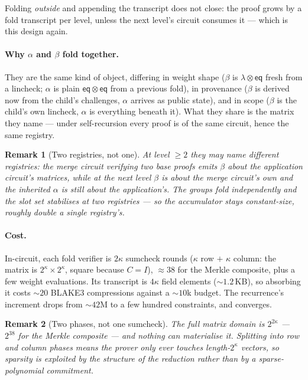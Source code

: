 \documentclass[11pt]{article}
\newcommand{\eq}{\mathsf{eq}}
\newtheorem{remark}{Remark}
\theoremstyle{definition}
\begin{document}
Folding \emph{outside} and appending the transcript does not close: the
proof grows by a fold transcript per level, unless the next level's circuit
consumes it --- which is this design again.

\paragraph{Why $\alpha$ and $\beta$ fold together.} They are the same kind
of object, differing in weight shape ($\beta$ is $\lambda \otimes \eq$
fresh from a lincheck; $\alpha$ is plain $\eq \otimes \eq$ from a previous
fold), in provenance ($\beta$ is derived now from the child's challenges,
$\alpha$ arrives as public state), and in scope ($\beta$ is the child's own
lincheck, $\alpha$ is everything beneath it). What they share is the matrix
they name --- under self-recursion every proof is of the same circuit, hence
the same registry.

\begin{remark}[Two registries, not one]
At level $\ge 2$ they may name \emph{different} registries: the merge
circuit verifying two \emph{base} proofs emits $\beta$ about the application
circuit's matrices, while at the next level $\beta$ is about the merge
circuit's own and the inherited $\alpha$ is still about the application's.
The groups fold independently and the slot set stabilises at two registries
--- so the accumulator stays constant-size, roughly double a single
registry's.
\end{remark}

\paragraph{Cost.} In-circuit, each fold verifier is $2\kappa$ sumcheck
rounds ($\kappa$ row $+$ $\kappa$ column: the matrix is
$2^\kappa \times 2^\kappa$, square because $C = I$), ${\approx}38$ for the
Merkle composite, plus a few weight evaluations. Its transcript is $4\kappa$
field elements (${\sim}1.2$\,KB), so absorbing it costs ${\sim}20$ BLAKE3
compressions against a ${\sim}10$k budget. The recurrence's increment drops
from ${\sim}42$M to a few hundred constraints, and converges.

\begin{remark}[Two phases, not one sumcheck]
The full matrix domain is $2^{2\kappa}$ --- $2^{38}$ for the Merkle
composite --- and nothing can materialise it. Splitting into row and column
phases means the prover only ever touches length-$2^\kappa$ vectors, so
sparsity is exploited by the \emph{structure of the reduction} rather than
by a sparse-polynomial commitment.
\end{remark}
\end{document}
